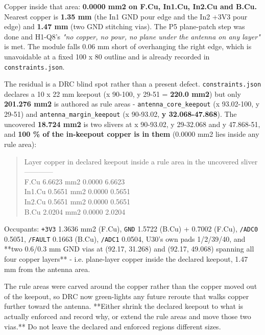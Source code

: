 \documentclass[11pt,a4paper]{article}
\begin{document}
Copper inside that area: \textbf{0.0000 mm2 on F.Cu, In1.Cu, In2.Cu and B.Cu.} Nearest copper is \textbf{1.35 mm} (the In1 GND pour edge and the In2 +3V3 pour edge) and \textbf{1.47 mm} (two GND stitching vias). The P5 plane-patch step was done and H1-Q8's \emph{"no copper, no pour, no plane under the antenna on any layer"} is met. The module falls 0.06 mm short of overhanging the right edge, which is unavoidable at a fixed 100 x 80 outline and is already recorded in \texttt{constraints.json}.

The residual is a DRC blind spot rather than a present defect. \texttt{constraints.json} declares a 10 x 22 mm keepout (x 90-100, y 29-51 = \textbf{220.0 mm2}) but only \textbf{201.276 mm2} is authored as rule areas - \texttt{antenna\_core\_keepout} (x 93.02-100, y 29-51) and \texttt{antenna\_margin\_keepout} (x 90-93.02, \textbf{y 32.068-47.868}). The uncovered \textbf{18.724 mm2} is two slivers at x 90-93.02, y 29-32.068 and y 47.868-51, and \textbf{100 \% of the in-keepout copper is in them} (0.0000 mm2 lies inside any rule area):

\begin{quote}\small\ttfamily\raggedright
\textbar{} Layer \textbar{} copper in declared keepout \textbar{} inside a rule area \textbar{} in the uncovered sliver \textbar{}\\
\textbar{}---\textbar{}---\textbar{}---\textbar{}---\textbar{}\\
\textbar{} F.Cu \textbar{} 6.6623 mm2 \textbar{} 0.0000 \textbar{} 6.6623 \textbar{}\\
\textbar{} In1.Cu \textbar{} 0.5651 mm2 \textbar{} 0.0000 \textbar{} 0.5651 \textbar{}\\
\textbar{} In2.Cu \textbar{} 0.5651 mm2 \textbar{} 0.0000 \textbar{} 0.5651 \textbar{}\\
\textbar{} B.Cu \textbar{} 2.0204 mm2 \textbar{} 0.0000 \textbar{} 2.0204 \textbar{}
\end{quote}
Occupants: \texttt{+3V3} 1.3636 mm2 (F.Cu), \texttt{GND} 1.5722 (B.Cu) + 0.7002 (F.Cu), \texttt{/ADC0} 0.5051, \texttt{/FAULT} 0.1663 (B.Cu), \texttt{/ADC1} 0.0504, U30's own pads 1/2/39/40, and {*}{*}two 0.6/0.3 mm GND vias at (92.17, 31.268) and (92.17, 49.068) spanning all four copper layers{*}{*} - i.e. plane-layer copper inside the declared keepout, 1.47 mm from the antenna area.

The rule areas were carved around the copper rather than the copper moved out of the keepout, so DRC now green-lights any future reroute that walks copper further toward the antenna. {*}{*}Either shrink the declared keepout to what is actually enforced and record why, or extend the rule areas and move those two vias.{*}{*} Do not leave the declared and enforced regions different sizes.
\end{document}
